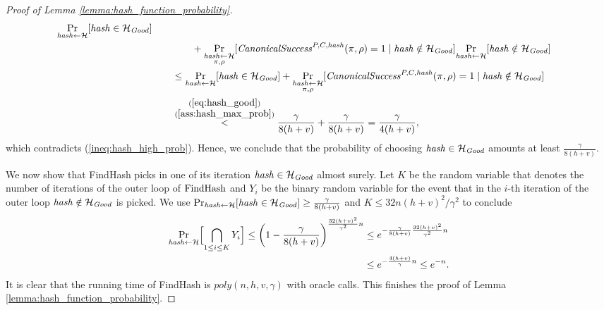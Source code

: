 \begin{proof}[Proof of Lemma \ref{lemma:hash_function_probability}]
\begin{align*}
  \underset{\operatorname{\mathit{hash}} \leftarrow \mathcal{H}}{\Pr}[\operatorname{\mathit{hash}} \in \mathcal{H}_{\mathit{Good}}] \\
  & \mbox\qquad\qquad + \underset{\substack{\operatorname{\mathit{hash}} \leftarrow \mathcal{H} \\ \pi, \rho}}{\Pr}[\operatorname{\mathit{CanonicalSuccess}}^{P,C,\operatorname{\mathit{hash}}}(\pi, \rho) = 1 \mid \operatorname{\mathit{hash}} \notin \mathcal{H}_{\mathit{Good}}]
  \underset{\operatorname{\mathit{hash}} \leftarrow \mathcal{H}}{\Pr}[\operatorname{\mathit{hash}} \notin \mathcal{H}_{\mathit{Good}}] \\
  & \mbox\qquad \leq \underset{\operatorname{\mathit{hash}} \leftarrow \mathcal{H}}{\Pr}[\operatorname{\mathit{hash}} \in \mathcal{H}_{\mathit{Good}}] +
  \underset{\substack{\operatorname{\mathit{hash}} \leftarrow \mathcal{H} \\ \pi, \rho}}{\Pr}[\operatorname{\mathit{CanonicalSuccess}}^{P,C,\operatorname{\mathit{hash}}}(\pi, \rho) = 1 \mid \operatorname{\mathit{hash}} \notin \mathcal{H}_{\mathit{Good}}] \\
  & \mbox\qquad  \stackrel{\substack{ (\ref{eq:hash_good}) \\ (\ref{ass:hash_max_prob})}}{<} \frac{\gamma}{8(h+v)} + \frac{\gamma}{8(h+v)} = \frac{\gamma}{4(h+v)},
\end{align*}
which contradicts (\ref{ineq:hash_high_prob}). Hence, we conclude that the probability of choosing $\operatorname{\mathit{hash}} \in \mathcal{H}_{\mathit{Good}}$ amounts at least $\frac{\gamma}{8(h+v)}$.

We now show that FindHash picks in one of its iteration $\operatorname{\mathit{hash}} \in \mathcal{H}_{\mathit{Good}}$ almost surely.
Let $K$ be the random variable that denotes the number of iterations of the outer loop of $\operatorname{\text{FindHash}}$
and $Y_i$ be the binary random variable for the event that in the $i$-th iteration of the outer loop $\operatorname{\mathit{hash}} \notin \mathcal{H}_{\mathit{Good}}$ is picked.
We use $\Pr_{\operatorname{\mathit{hash}} \leftarrow \mathcal{H}}[\operatorname{\mathit{hash}} \in \mathcal{H}_{\operatorname{\mathit{Good}}}] \geq \frac{\gamma}{8(h+v)}$ and $K \leq 32n(h+v)^2/\gamma^2$ to conclude
\begin{align*}
  \underset{\operatorname{\mathit{hash}} \leftarrow \mathcal{H}}{\Pr}\Bigl[ \bigcap_{1 \leq i \leq K} Y_i \Bigr] \leq \left(1 - \frac{\gamma}{8(h+v)}\right)^{\frac{32(h+v)^2}{\gamma^2}n}
    &\leq e^{-\frac{\gamma}{8(h+v)} \frac{32(h+v)^2}{\gamma^2}n} \\
    &\leq e^{-\frac{4(h+v)}{\gamma}n} \leq e^{-n}.
\end{align*}
It is clear that the running time of FindHash is $\mathit{poly}(n,h,v,\gamma)$ with oracle calls.
This finishes the proof of Lemma \ref{lemma:hash_function_probability}.
\end{proof}

